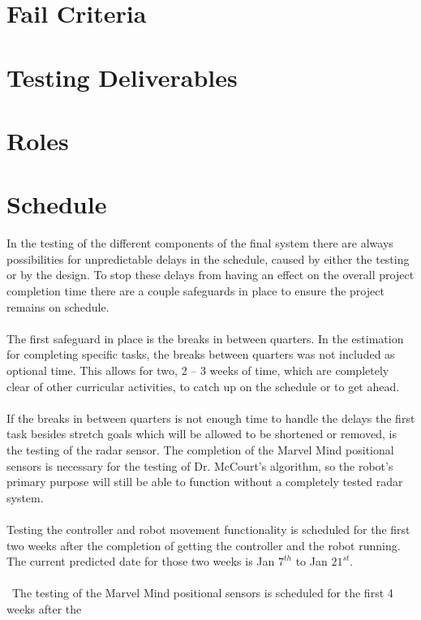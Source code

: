 \documentclass[english,12pt]{article}
\begin{document}
\section{Fail Criteria}

\section{Testing Deliverables}

\section{Roles}

\section{Schedule}
In the testing of the different components of the final system there are always possibilities 
for unpredictable delays in the schedule, caused by either the testing or by the design. 
To stop these delays from having an effect on the overall project completion time there are a 
couple safeguards in place to ensure the project remains on schedule.\\\\
The first safeguard in place is the breaks in between quarters. In the estimation for 
completing specific tasks, the breaks between quarters was not included as optional time. 
This allows for two, 2 – 3 weeks of time, which are completely clear of other curricular 
activities, to catch up on the schedule or to get ahead.\\\\
If the breaks in between quarters is not enough time to handle the delays the first task 
besides stretch goals which will be allowed to be shortened or removed, is the testing of 
the radar sensor. The completion of the Marvel Mind positional sensors is necessary for the 
testing of Dr. McCourt’s algorithm, so the robot’s primary purpose will still be able to 
function without a completely tested radar system.\\\\
Testing the controller and robot movement functionality is scheduled for the first two weeks 
after the completion of getting the controller and the robot running. The current predicted date 
for those two weeks is Jan $7^{th}$ to Jan $21^{st}$.\\\\\
The testing of the Marvel Mind positional sensors is scheduled for the first 4 weeks after the 
\end{document}
